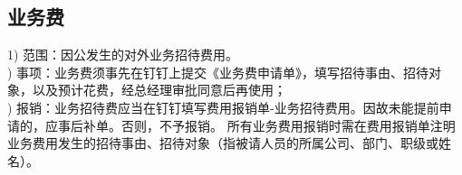 \documentclass[]{article}
\begin{document}

\subsection{业务费}

1)	范围：因公发生的对外业务招待费用。\\)	事项：业务费须事先在钉钉上提交《业务费申请单》，填写招待事由、招待对象，以及预计花费，经总经理审批同意后再使用；\\)	报销：业务招待费应当在钉钉填写费用报销单-业务招待费用。因故未能提前申请的，应事后补单。否则，不予报销。
所有业务费用报销时需在费用报销单注明业务费用发生的招待事由、招待对象（指被请人员的所属公司、部门、职级或姓名）。
\end{document}
